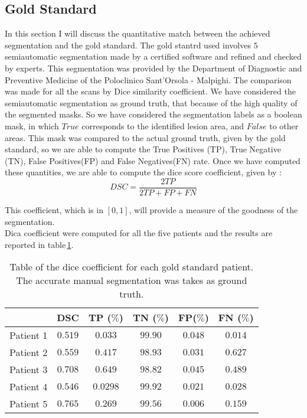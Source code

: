 \documentclass{standalone}
\begin{document}
	\subsection{Gold Standard}
	
	In this section I will discuss the quantitative match between the achieved segmentation and the gold standard. The gold stantrd used involves $5$ semiautomatic segmentation made by a certified software and refined and checked by experts. This segmentation was provided by the Department of Diagnostic and Preventive Medicine of the Poloclinico Sant'Orsola - Malpighi.
	The comparison was made for all the scans by Dice similarity coefficient. We have considered the semiautomatic segmentation as ground truth, that because of the high quality of the segmented masks. 
	So we have considered the segmentation labels as a boolean mask, in which $True$ corresponds to the identified lesion area, and $False$ to other areas. This mask was compared to the actual ground truth, given by the gold standard, so we are able to compute the True Positives (TP), True Negative (TN), False Positives(FP) and False Negatives(FN) rate. Once we have computed these quantities, we are able to compute the dice score coefficient, given by :  
	\begin{equation}
		DSC = \frac{2TP}{2TP + FP + FN}
	\end{equation}

	This coefficient, which is in $[0, 1]$, will provide a measure of the goodness of the segmentation.\\ Dica coefficient were computed for all the five patients and the results are reported in table\,\ref{tab:DSC}. 
	
	\begin{table}[h!]
		\centering
		\begin{tabular}{|c|c|c|c|c|c|}
			\hline
				  &DSC		&TP	($\%$)	&TN	($\%$)&FP($\%$)	&FN	($\%$)	\\ \hline
		Patient 1 &	$0.519$	& $0.033$	& $99.90$ &	$0.048$	& $0.014$	\\
		Patient 2 & $0.559$	& $0.417$	& $98.93$ &	$0.031$	& $0.627$	\\
		Patient 3 &	$0.708$	& $0.649$	& $98.82$ & $0.045$	& $0.489$	\\
		Patient 4 &	$0.546$	& $0.0298$	& $99.92$ &	$0.021$	& $0.028$	\\
		Patient 5 &	$0.765$	& $0.269$	& $99.56$ &	$0.006$	& $0.159$	\\ \hline

		\end{tabular}\caption{Table of the dice coefficient for each gold standard patient. The accurate manual segmentation was takes as ground truth. }\label{tab:DSC}
	\end{table}
\end{document}
